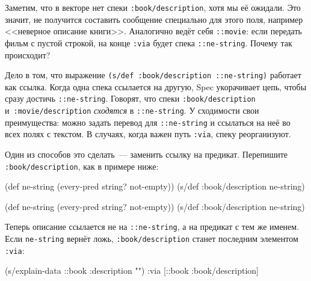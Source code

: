 \fi

Заметим, что в векторе нет спеки \texttt{:book/de\-scription}, хотя мы её
ожидали. Это значит, не получится составить сообщение специально для этого поля,
например <<неверное описание книги>>. Аналогично ведёт себя \verb|::movie|: если
передать фильм с пустой строкой, на конце \verb|:via| будет спека
\verb|::ne-string|. Почему так происходит?


Дело в том, что выражение \texttt{(s/def :book/description ::ne\--string)}
работает как ссылка. Когда одна спека ссылается на другую, Spec укорачивает
цепь, чтобы сразу достичь \verb|::ne-string|. Говорят, что спеки
\verb|:book/description| и~\verb|:movie/description| \emph{сходятся} в
\verb|::ne-string|. У сходимости свои преимущества: можно задать перевод для
\verb|::ne-string| и ссылаться на неё во всех полях с текстом. В случаях, когда
важен путь \verb|:via|, спеку реорганизуют.

\mnoindent
Один из способов это сделать~--- заменить ссылку на предикат. Перепишите
\verb|:book/description|, как в примере ниже:

\ifx\DEVICETYPE\MOBILE

\begin{english}
  \begin{clojure}
(def ne-string
  (every-pred string? not-empty))
(s/def :book/description ne-string)
  \end{clojure}
\end{english}

\else

\begin{english}
  \begin{clojure}
(def ne-string (every-pred string? not-empty))
(s/def :book/description ne-string)
  \end{clojure}
\end{english}

\fi

Теперь описание ссылается не на \verb|::ne-string|, а на предикат с тем же
именем. Если \verb|ne-string| вернёт ложь, \verb|:book/description| станет
последним элементом \verb|:via|:

\ifx\DEVICETYPE\MOBILE

\begin{english}
  \begin{clojure}
(s/explain-data ::book
  {:description ""})
{:via [::book :book/description]}
  \end{clojure}
\end{english}

